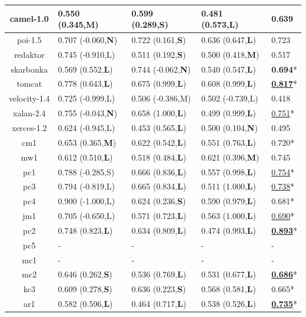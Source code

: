 \begin{table}[!t]
\begin{tabular}{|@{}c@{}||@{}C{21mm}@{}|@{}C{21mm}@{}|@{}C{21mm}@{}||@{}C{8mm}@{}|}
camel-1.0	&0.550 (0.345,{\bf M})	&0.599 (0.289,{\bf S})	&0.481 (0.573,{\bf L})	&0.639 \\ \hline
poi-1.5	&0.707 (-0.060,{\bf N})	&0.722 (0.161,{\bf S})	&0.636 (0.647,{\bf L})	&0.723 \\ \hline
redaktor	&0.745 (-0.910,L)	&0.511 (0.192,{\bf S})	&0.500 (0.418,{\bf M})	&0.517 \\ \hline
skarbonka	&0.569 (0.552,{\bf L})	&0.744 (-0.062,{\bf N})	&0.540 (0.547,{\bf L})	&{\bf 0.694}* \\ \hline
tomcat	&0.778 (0.643,{\bf L})	&0.675 (0.999,{\bf L})	&0.608 (0.999,{\bf L})	&\underline{{\bf 0.817}}* \\ \hline
velocity-1.4	&0.725 (-0.999,L)	&0.506 (-0.386,M)	&0.502 (-0.739,L)	&0.418 \\ \hline
xalan-2.4	&0.755 (-0.043,{\bf N})	&0.658 (1.000,{\bf L})	&0.499 (0.999,{\bf L})	&\underline{0.751}* \\ \hline
xerces-1.2	&0.624 (-0.945,L)	&0.453 (0.565,{\bf L})	&0.500 (0.104,{\bf N})	&0.495 \\ \hline
cm1	&0.653 (0.365,{\bf M})	&0.622 (0.542,{\bf L})	&0.551 (0.763,{\bf L})	&0.720* \\ \hline
mw1	&0.612 (0.510,{\bf L})	&0.518 (0.484,{\bf L})	&0.621 (0.396,{\bf M})	&0.745 \\ \hline
pc1	&0.788 (-0.285,S)	&0.666 (0.836,{\bf L})	&0.557 (0.998,{\bf L})	&\underline{0.754}* \\ \hline
pc3	&0.794 (-0.819,L)	&0.665 (0.834,{\bf L})	&0.511 (1.000,{\bf L})	&\underline{0.738}* \\ \hline
pc4	&0.900 (-1.000,L)	&0.624 (0.236,{\bf S})	&0.590 (0.979,{\bf L})	&0.681* \\ \hline
jm1	&0.705 (-0.650,L)	&0.571 (0.723,{\bf L})	&0.563 (1.000,{\bf L})	&\underline{0.690}* \\ \hline
pc2	&0.748 (0.823,{\bf L})	&0.634 (0.809,{\bf L})	&0.474 (0.993,{\bf L})	&\underline{{\bf 0.893}}* \\ \hline
pc5	&-	&-	&-	& - \\ \hline
mc1	&-	&-	&-	& - \\ \hline
mc2	&0.646 (0.262,{\bf S})	&0.536 (0.769,{\bf L})	&0.531 (0.677,{\bf L})	&\underline{{\bf 0.686}}* \\ \hline
kc3	&0.609 (0.278,{\bf S})	&0.636 (0.223,{\bf S})	&0.568 (0.581,{\bf L})	&0.665* \\ \hline
ar1	&0.582 (0.596,{\bf L})	&0.464 (0.717,{\bf L})	&0.538 (0.526,{\bf L})	&\underline{{\bf 0.735}}* \\ \hline

\end{tabular}
\end{table}
